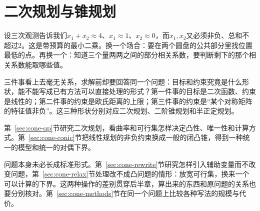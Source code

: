 \chapter{二次规划与锥规划}
\label{chap:quadratic-conic-programming}

设三次观测告诉我们$x_1+x_2\approx4$、$x_1\approx1$、$x_2\approx0$，而$x_1,x_2$又必须非负、总和不超过$2$。这是带预算的最小二乘。换一个场合：要在两个圆盘的公共部分里找位置最低的点。再换一个：知道三个量两两之间的部分相关系数，要判断剩下的那个相关系数能取哪些值。

三件事看上去毫无关系，求解前却要回答同一个问题：目标和约束究竟是什么形状，能不能写成已有方法可以直接处理的形式？第一件事的目标是二次函数、约束是线性的；第二件事的约束是欧氏距离的上限；第三件事的约束是“某个对称矩阵的特征值非负”。这三种形状分别对应二次规划、二阶锥规划和半正定规划。

第~\ref{sec:cone-qp}节研究二次规划，看曲率和可行集怎样决定凸性、唯一性和计算方式。第~\ref{sec:cone-conic}节把线性规划的非负约束换成一般的闭凸锥，得到一种统一的模型和统一的对偶下界。

问题本身未必长成标准形式。第~\ref{sec:cone-rewrite}节研究怎样引入辅助变量而不改变问题，第~\ref{sec:cone-relax}节处理改不成凸问题的情形：放宽可行集，换来一个可以计算的下界。这两种操作的差别贯穿后半章，算出来的东西和原问题的关系也要分别核对。第~\ref{sec:cone-methods}节在同一个问题上比较各种写法的规模与代价。







